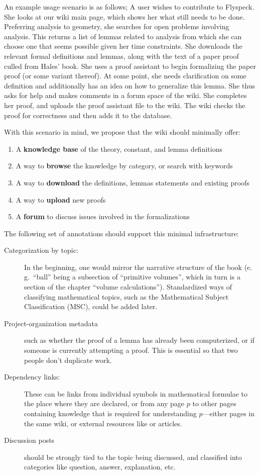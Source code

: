 An example usage scenario is as follows; A user wishes to contribute to
Flyspeck.  She looks at our wiki main page, which shows her what still needs to
be done.  Preferring analysis to geometry, she searches for open problems
involving analysis.  This returns a list of lemmas related to analysis from
which she can choose one that seems possible given her time constraints. She
downloads the relevant formal definitions and lemmas, along with the text of a
paper proof culled from Hales' book.  She uses a proof assistant to begin
formalizing the paper proof (or some variant thereof).  At some point, she needs
clarification on some definition and additionally has an idea on how to
generalize this lemma.  She thus asks for help and makes comments in a forum
space of the wiki.  She completes her proof, and uploads the proof assistant
file to the wiki.  The wiki checks the proof for correctness and then adds it to
the database.

With this scenario in mind, we propose that the wiki should minimally offer: 

\begin{enumerate} 
\item A \textbf{knowledge base} of the theory, constant, and lemma definitions 
\item A way to \textbf{browse} the knowledge by category, or search with keywords 
\item A way to \textbf{download} the definitions, lemmas statements and existing
  proofs
\item A way to \textbf{upload} new proofs 
\item A \textbf{forum} to discuss issues involved in the formalizations 
\end{enumerate} 

The following set of annotations should support this minimal infrastructure:

\begin{description}
\item[Categorization by topic:] In the beginning, one would mirror the narrative structure
  of the book (e.\,g.\ ``ball'' being a subsection of ``primitive volumes'', which in turn
  is a section of the chapter ``volume calculations'').  Standardized ways of classifying
  mathematical topics, such as the Mathematical Subject Classification
  (MSC)\cite{AMS:MSC2000}, could be added later.
\item[Project-organization metadata] such as whether the proof
  of a lemma has already been computerized, or if someone is currently 
  attempting a proof.  This is essential so that two people don't duplicate
  work.
\item[Dependency links:] These can be links from individual symbols in
  mathematical formulae to the place where they are declared, or from any page
  $p$ to other pages containing knowledge that is required for understanding $p$---either pages in the same wiki, or external resources like
   or  articles.
\item[Discussion posts] should be strongly tied to the topic being discussed,
  and classified into categories like question, answer, explanation, etc.
\end{description}

